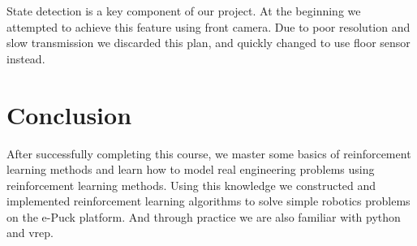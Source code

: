 \documentclass[a4paper, 11pt]{article} %
\begin{document}
State
detection is a key component of our project. At the beginning we attempted to
achieve this feature using front camera. Due to poor resolution and slow transmission
we discarded this plan, and quickly changed to use floor sensor instead.

\section{Conclusion}
After successfully completing this course, we master some basics of reinforcement
learning methods and learn how to model real engineering problems using reinforcement
learning methods. Using this knowledge we constructed and implemented reinforcement
learning algorithms to solve simple robotics problems on the e-Puck platform. And
through practice we are also familiar with python and vrep.
\end{document}
